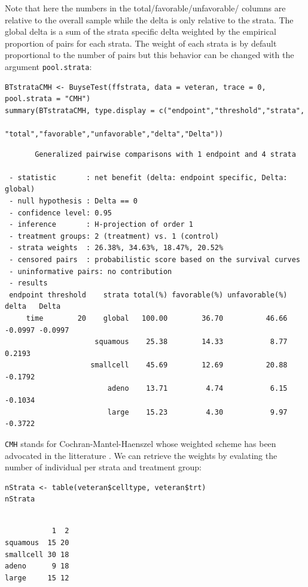 \documentclass[12pt]{article}
\begin{document}
Note that here the numbers in the total/favorable/unfavorable/ columns
are relative to the overall sample while the delta is only relative to
the strata. The global delta is a sum of the strata specific delta
weighted by the empirical proportion of pairs for each strata. The
weight of each strata is by default proportional to the number of
pairs but this behavior can be changed with the argument \texttt{pool.strata}:

\lstset{language=r,label= ,caption= ,captionpos=b,numbers=none}
\begin{lstlisting}
BTstrataCMH <- BuyseTest(ffstrata, data = veteran, trace = 0, pool.strata = "CMH")
summary(BTstrataCMH, type.display = c("endpoint","threshold","strata",
                                      "total","favorable","unfavorable","delta","Delta"))
\end{lstlisting}

\begin{verbatim}
       Generalized pairwise comparisons with 1 endpoint and 4 strata

 - statistic       : net benefit (delta: endpoint specific, Delta: global) 
 - null hypothesis : Delta == 0 
 - confidence level: 0.95 
 - inference       : H-projection of order 1
 - treatment groups: 2 (treatment) vs. 1 (control) 
 - strata weights  : 26.38%, 34.63%, 18.47%, 20.52% 
 - censored pairs  : probabilistic score based on the survival curves
 - uninformative pairs: no contribution
 - results
 endpoint threshold    strata total(%) favorable(%) unfavorable(%)   delta   Delta
     time        20    global   100.00        36.70          46.66 -0.0997 -0.0997
                     squamous    25.38        14.33           8.77  0.2193        
                    smallcell    45.69        12.69          20.88 -0.1792        
                        adeno    13.71         4.74           6.15 -0.1034        
                        large    15.23         4.30           9.97 -0.3722
\end{verbatim}

\texttt{CMH} stands for Cochran-Mantel-Haenszel whose weighted scheme has
been advocated in the litterature \citep{dong2018stratified}. We can
retrieve the weights by evalating the number of individual per strata
and treatment group:
\lstset{language=r,label= ,caption= ,captionpos=b,numbers=none}
\begin{lstlisting}
nStrata <- table(veteran$celltype, veteran$trt)
nStrata
\end{lstlisting}

\begin{verbatim}

           1  2
squamous  15 20
smallcell 30 18
adeno      9 18
large     15 12
\end{verbatim}
\end{document}
